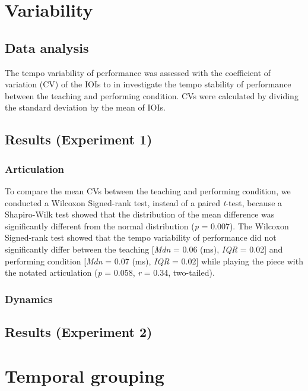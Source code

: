 \documentclass[
  man,floatsintext]{apa6}
\begin{document}
\clearpage

\hypertarget{variability}{%
\section{Variability}\label{variability}}

\hypertarget{data-analysis-2}{%
\subsection{Data analysis}\label{data-analysis-2}}

The tempo variability of performance was assessed with the coefficient of variation (CV) of the IOIs to in investigate the tempo stability of performance between the teaching and performing condition. CVs were calculated by dividing the standard deviation by the mean of IOIs.

\hypertarget{results-experiment-1}{%
\subsection{Results (Experiment 1)}\label{results-experiment-1}}

\hypertarget{articulation-2}{%
\subsubsection{Articulation}\label{articulation-2}}

To compare the mean CVs between the teaching and performing condition, we conducted a Wilcoxon Signed-rank test, instead of a paired \emph{t}-test, because a Shapiro-Wilk test showed that the distribution of the mean difference was significantly different from the normal distribution (\emph{p} = 0.007). The Wilcoxon Signed-rank test showed that the tempo variability of performance did not significantly differ between the teaching {[}\emph{Mdn} = 0.06 (ms), \emph{IQR} = 0.02{]} and performing condition {[}\emph{Mdn} = 0.07 (ms), \emph{IQR} = 0.02{]} while playing the piece with the notated articulation (\emph{p} = 0.058, \emph{r} = 0.34, two-tailed).

\hypertarget{dynamics-2}{%
\subsubsection{Dynamics}\label{dynamics-2}}

\hypertarget{results-experiment-2}{%
\subsection{Results (Experiment 2)}\label{results-experiment-2}}

\hypertarget{temporal-grouping}{%
\section{Temporal grouping}\label{temporal-grouping}}
\end{document}
